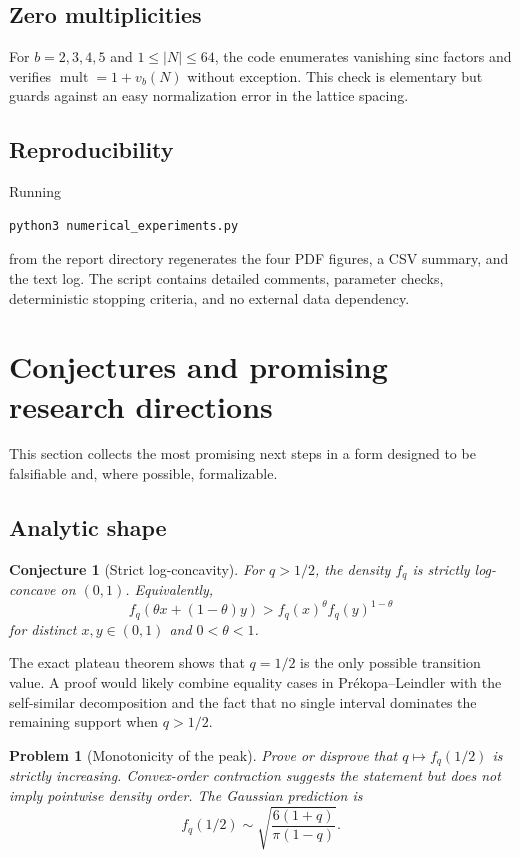 \documentclass[11pt,oneside]{article}
\newtheorem{conjecture}[theorem]{Conjecture}
\newtheorem{problem}[theorem]{Problem}
\theoremstyle{definition}
\theoremstyle{remark}
\begin{document}
\subsection{Zero multiplicities}

For $b=2,3,4,5$ and $1\le|N|\le64$, the code enumerates vanishing sinc factors and verifies
\(
 \operatorname{mult}=1+v_b(N)
\)
without exception.  This check is elementary but guards against an easy normalization error
in the lattice spacing.

\subsection{Reproducibility}

Running
\begin{lstlisting}[style=code]
python3 numerical_experiments.py
\end{lstlisting}
from the report directory regenerates the four PDF figures, a CSV summary, and the text log.
The script contains detailed comments, parameter checks, deterministic stopping criteria, and
no external data dependency.

\section{Conjectures and promising research directions}
\label{sec:future}

This section collects the most promising next steps in a form designed to be falsifiable and,
where possible, formalizable.

\subsection{Analytic shape}

\begin{conjecture}[Strict log-concavity]
For $q>1/2$, the density $f_q$ is strictly log-concave on $(0,1)$.  Equivalently,
\[
 f_q(\theta x+(1-\theta)y)
 >f_q(x)^\theta f_q(y)^{1-\theta}
\]
for distinct $x,y\in(0,1)$ and $0<\theta<1$.
\end{conjecture}

The exact plateau theorem shows that $q=1/2$ is the only possible transition value.  A proof
would likely combine equality cases in Pr\'ekopa--Leindler with the self-similar decomposition
and the fact that no single interval dominates the remaining support when $q>1/2$.

\begin{problem}[Monotonicity of the peak]
Prove or disprove that $q\mapsto f_q(1/2)$ is strictly increasing.  Convex-order contraction
suggests the statement but does not imply pointwise density order.  The Gaussian prediction is
\[
 f_q(1/2)\sim\sqrt{\frac{6(1+q)}{\pi(1-q)}}.
\]
\end{problem}
\end{document}
